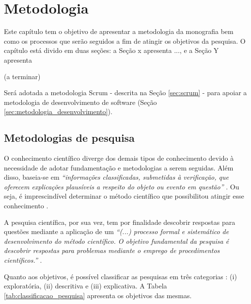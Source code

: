 \chapter[Metodologia]{Metodologia}\label{ch:metodologia}

Este capítulo tem o objetivo de apresentar a metodologia da monografia bem como os processos que serão seguidos a fim de atingir os objetivos da pesquisa. O capítulo está divido em duas seções: a Seção x apresenta ..., e a Seção Y apresenta 

(a terminar)


Será adotada a metodologia Scrum - descrita na Seção \ref{sec:scrum} - para apoiar a metodologia de desenvolvimento de software (Seção \ref{sec:metodologia_desenvolvimento}).

\section{Metodologias de pesquisa}

O conhecimento científico diverge dos demais tipos de conhecimento devido à necessidade de adotar fundamentação e metodologias a serem seguidas. Além disso, baseia-se em \textit{“informações classificadas, submetidas à verificação, que oferecem explicações plausíveis a respeito do objeto ou evento em questão”} \cite[pág. 22]{prodanov2013}. Ou seja, é imprescindível determinar o método científico que possibilitou atingir esse conhecimento \cite[pág. 24]{prodanov2013}. 

A pesquisa científica, por sua vez, tem por finalidade descobrir respostas para questões mediante a aplicação de um \textit{“(...) processo formal e sistemático de desenvolvimento do método científico. O objetivo fundamental da pesquisa é descobrir respostas para problemas mediante o emprego de procedimentos científicos.”}  \cite[pág. 26]{gil2008}.

Quanto aos objetivos, é possível classificar as pesquisas em três categorias \cite[pág. 41]{gil2002}: (i) exploratória, (ii) descritiva e (iii) explicativa. A Tabela \ref{tab:classificacao_pesquisa} apresenta os objetivos das mesmas.

